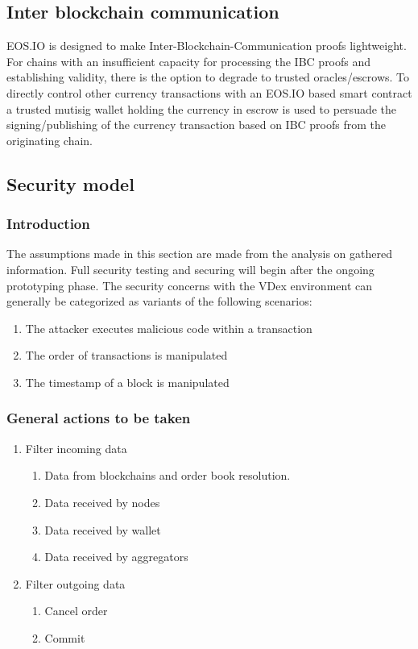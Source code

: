 \documentclass[]{article}
\begin{document}
\subsection{Inter blockchain communication}
EOS.IO is designed to make Inter-Blockchain-Communication proofs lightweight. For chains with an insufficient capacity for processing the  IBC proofs and establishing validity, 
there is the option to degrade to trusted oracles/escrows.
To directly control other currency transactions with an
EOS.IO based smart contract a trusted mutisig wallet holding the currency 
in escrow is used to persuade the signing/publishing of the currency 
transaction based on IBC proofs from the originating chain.	
\subsection{Security model}
\subsubsection{Introduction}
The assumptions made in this section are made from the analysis on gathered information. Full security testing and securing will begin after the ongoing prototyping phase. 
The security concerns with the VDex environment can generally be categorized as variants of the following scenarios:
	\begin{enumerate}
		\item The attacker executes malicious code within a transaction
		\item The order of transactions is manipulated
		\item The timestamp of a block is manipulated
	\end{enumerate}
	\subsubsection{General actions to be taken}
		\begin{enumerate}	
		\item{Filter incoming data} 
		\begin{enumerate}
			\item Data from blockchains and order book resolution.
			\item Data received by nodes
			\item Data received by wallet
			\item Data received by aggregators
		\end{enumerate}
		\item {Filter outgoing data}
		\begin{enumerate}
			\item Cancel order
			\item Commit
		\end{enumerate}
	\end{enumerate}
\end{document}
